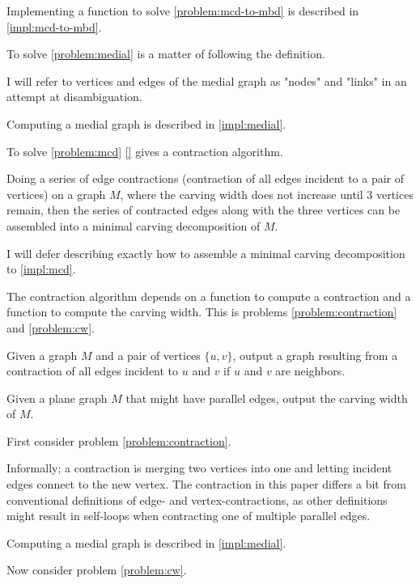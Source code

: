\documentclass{article}
\begin{document}
	Implementing a function to solve \ref{problem:mcd-to-mbd} is described in \ref{impl:mcd-to-mbd}.

	To solve \ref{problem:medial} is a matter of following the definition.

	I will refer to vertices and edges of the medial graph as "nodes" and "links" in an attempt at disambiguation. 

	Computing a medial graph is described in \ref{impl:medial}.

	To solve \ref{problem:mcd} \ref{} gives a contraction algorithm.

	Doing a series of edge contractions (contraction of all edges incident to a pair of vertices) on a graph $M$, where the carving width does not increase until 3 vertices remain, then the series of contracted edges along with the three vertices can be assembled into a minimal carving decomposition of $M$.
	
	I will defer describing exactly how to assemble a minimal carving decomposition to \ref{impl:mcd}.

	The contraction algorithm depends on a function to compute a contraction and a function to compute the carving width. This is problems \ref{problem:contraction} and \ref{problem:cw}.

	\begin{problem}\label{problem:contraction}
		Given a graph $M$ and a pair of vertices $\{u, v\}$, output a graph resulting from a contraction of all edges incident to $u$ and $v$ if $u$ and $v$ are neighbors.
	\end{problem}

	\begin{problem}\label{problem:cw}
		Given a plane graph $M$ that might have parallel edges, output the carving width of $M$.
	\end{problem}

	First consider problem \ref{problem:contraction}.

	Informally; a contraction is merging two vertices into one and letting incident edges connect to the new vertex. The contraction in this paper differs a bit from conventional definitions of edge- and vertex-contractions, as other definitions might result in self-loops when contracting one of multiple parallel edges.

	

	Computing a medial graph is described in \ref{impl:medial}.

	Now consider problem \ref{problem:cw}.
\end{document}
